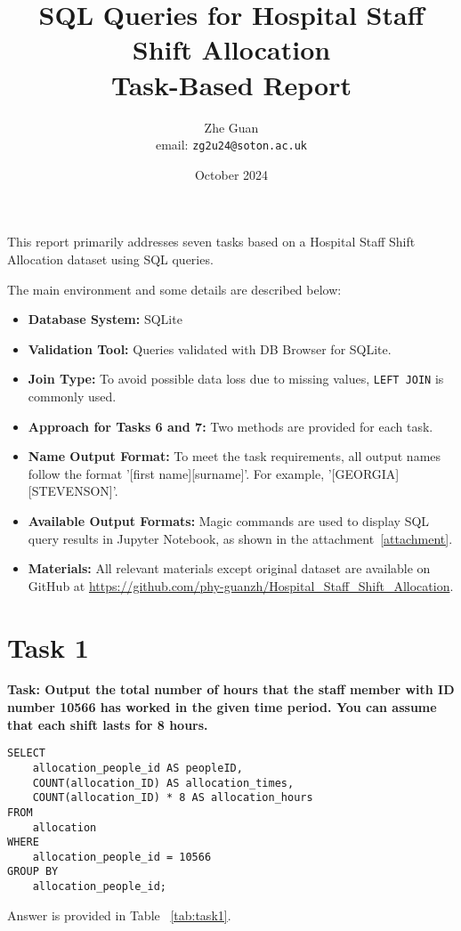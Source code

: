 \documentclass{article}
\title{\textbf{SQL Queries for Hospital Staff Shift Allocation \\ Task-Based Report}}
\author{Zhe Guan  \\ email: \texttt{zg2u24@soton.ac.uk}}
\date{October 2024}
\begin{document}
\maketitle

This report primarily addresses seven tasks based on a Hospital Staff Shift Allocation dataset using SQL queries.

The main environment and some details are described below:

\begin{itemize}
    \item \textbf{Database System:} SQLite
    \item \textbf{Validation Tool:} Queries validated with DB Browser for SQLite.
    \item \textbf{Join Type:} To avoid possible data loss due to missing values, \texttt{LEFT JOIN} is commonly used.
    \item \textbf{Approach for Tasks 6 and 7:} Two methods are provided for each task.
    \item \textbf{Name Output Format:} To meet the task requirements, all output names follow the format '[first name][surname]'. For example, '[GEORGIA][STEVENSON]'.
    \item \textbf{Available Output Formats:} Magic commands are used to display SQL query results in Jupyter Notebook, as shown in the attachment~\ref{attachment}.
    \item \textbf{Materials:} All relevant materials except original dataset are available on GitHub at \url{https://github.com/phy-guanzh/Hospital_Staff_Shift_Allocation}.
\end{itemize}



\section{Task 1}
\textbf{Task: Output the total number of hours that the staff member with ID number 10566 has worked in the given time period. You can assume that each shift lasts for 8 hours.}

\begin{lstlisting}[style=sqlstyle]
SELECT
    allocation_people_id AS peopleID,
    COUNT(allocation_ID) AS allocation_times,
    COUNT(allocation_ID) * 8 AS allocation_hours
FROM 
    allocation
WHERE 
    allocation_people_id = 10566
GROUP BY
    allocation_people_id;
\end{lstlisting}

Answer is provided in Table ~\ref{tab:task1}.
\end{document}

